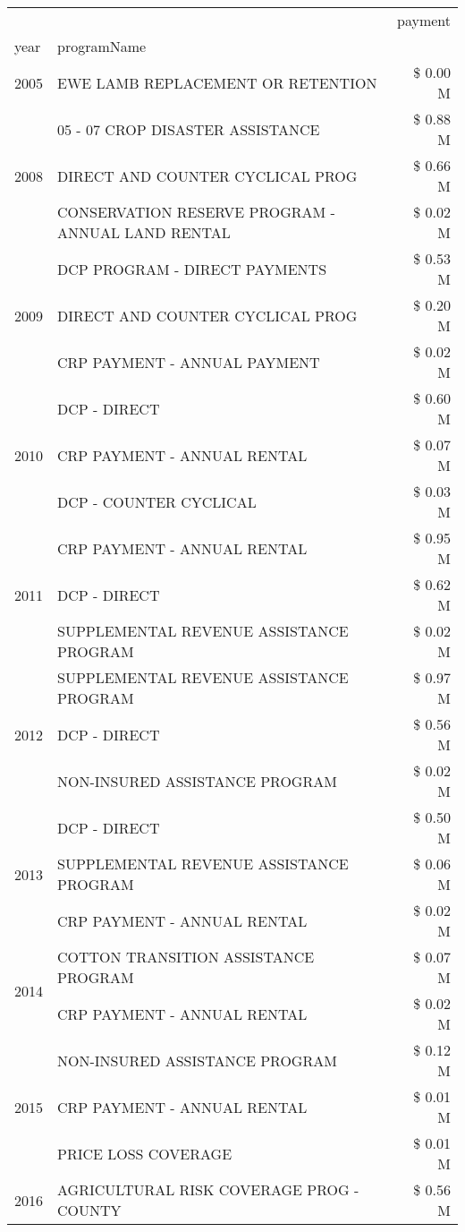 \begin{tabular}{llr}
\toprule
 &  & payment \\
year & programName &  \\
\midrule
2005 & EWE LAMB REPLACEMENT OR RETENTION & \$ 0.00 M \\
\cline{1-3}
\multirow[t]{3}{*}{2008} & 05 - 07 CROP DISASTER ASSISTANCE & \$ 0.88 M \\
 & DIRECT AND COUNTER CYCLICAL PROG & \$ 0.66 M \\
 & CONSERVATION RESERVE PROGRAM - ANNUAL LAND RENTAL & \$ 0.02 M \\
\cline{1-3}
\multirow[t]{3}{*}{2009} & DCP PROGRAM - DIRECT PAYMENTS & \$ 0.53 M \\
 & DIRECT AND COUNTER CYCLICAL PROG & \$ 0.20 M \\
 & CRP PAYMENT - ANNUAL PAYMENT & \$ 0.02 M \\
\cline{1-3}
\multirow[t]{3}{*}{2010} & DCP - DIRECT & \$ 0.60 M \\
 & CRP PAYMENT - ANNUAL RENTAL & \$ 0.07 M \\
 & DCP - COUNTER CYCLICAL & \$ 0.03 M \\
\cline{1-3}
\multirow[t]{3}{*}{2011} & CRP PAYMENT - ANNUAL RENTAL & \$ 0.95 M \\
 & DCP - DIRECT & \$ 0.62 M \\
 & SUPPLEMENTAL REVENUE ASSISTANCE PROGRAM & \$ 0.02 M \\
\cline{1-3}
\multirow[t]{3}{*}{2012} & SUPPLEMENTAL REVENUE ASSISTANCE PROGRAM & \$ 0.97 M \\
 & DCP - DIRECT & \$ 0.56 M \\
 & NON-INSURED ASSISTANCE PROGRAM & \$ 0.02 M \\
\cline{1-3}
\multirow[t]{3}{*}{2013} & DCP - DIRECT & \$ 0.50 M \\
 & SUPPLEMENTAL REVENUE ASSISTANCE PROGRAM & \$ 0.06 M \\
 & CRP PAYMENT - ANNUAL RENTAL & \$ 0.02 M \\
\cline{1-3}
\multirow[t]{2}{*}{2014} & COTTON TRANSITION ASSISTANCE PROGRAM & \$ 0.07 M \\
 & CRP PAYMENT - ANNUAL RENTAL & \$ 0.02 M \\
\cline{1-3}
\multirow[t]{3}{*}{2015} & NON-INSURED ASSISTANCE PROGRAM & \$ 0.12 M \\
 & CRP PAYMENT - ANNUAL RENTAL & \$ 0.01 M \\
 & PRICE LOSS COVERAGE & \$ 0.01 M \\
\cline{1-3}
\multirow[t]{3}{*}{2016} & AGRICULTURAL RISK COVERAGE PROG - COUNTY & \$ 0.56 M \\

\end{tabular}

